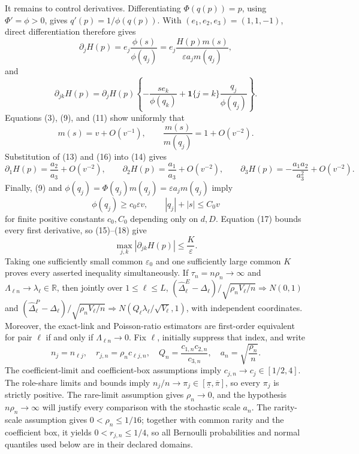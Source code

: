 It remains to control derivatives. Differentiating \(\Phi(q(p))=p\), using \(\Phi'=\phi>0\), gives \(q'(p)=1/\phi(q(p))\). With \((e_1,e_2,e_3)=(1,1,-1)\), direct differentiation therefore gives
\[
 \partial_jH(p)=e_j\frac{\phi(s)}{\phi(q_j)}
 =e_j\frac{H(p)m(s)}{\varepsilon a_jm(q_j)},
\tag{14}
\]
and
\[
 \partial_{jk}H(p)=\partial_jH(p)
 \left\{-\frac{s e_k}{\phi(q_k)}
 +\boldsymbol 1\{j=k\}\frac{q_j}{\phi(q_j)}\right\}.
\tag{15}
\]
Equations (3), (9), and (11) show uniformly that
\[
 m(s)=v+O(v^{-1}),
 \qquad \frac{m(s)}{m(q_j)}=1+O(v^{-2}).
\tag{16}
\]
Substitution of (13) and (16) into (14) gives
\[
 \partial_1H(p)=\frac{a_2}{a_3}+O(v^{-2}),\qquad
 \partial_2H(p)=\frac{a_1}{a_3}+O(v^{-2}),\qquad
 \partial_3H(p)=-\frac{a_1a_2}{a_3^2}+O(v^{-2}).
\tag{17}
\]
Finally, (9) and \(\phi(q_j)=\Phi(q_j)m(q_j)=\varepsilon a_jm(q_j)\) imply
\[
 \phi(q_j)\geq c_0\varepsilon v,
 \qquad |q_j|+|s|\leq C_0v
\tag{18}
\]
for finite positive constants \(c_0,C_0\) depending only on \(d,D\). Equation (17) bounds every first derivative, so (15)--(18) give
\[
 \max_{j,k}|\partial_{jk}H(p)|\leq\frac{K}{\varepsilon}.
\]
Taking one sufficiently small common \(\varepsilon_0\) and one sufficiently large common \(K\) proves every asserted inequality simultaneously.
If \(\tau_n=n\rho_n\to\infty\) and \(\Lambda_{\ell n}\to\lambda_{\ell}\in\mathbb R\), then jointly over \(1\leq\ell\leq L\), \((\widehat\Delta^E_{\ell}-\Delta_{\ell})/\sqrt{\rho_nV_{\ell}/n}\Rightarrow N(0,1)\) and \((\widehat\Delta^P_{\ell}-\Delta_{\ell})/\sqrt{\rho_nV_{\ell}/n}\Rightarrow N(Q_{\ell}\lambda_{\ell}/\sqrt{V_{\ell}},1)\), with independent coordinates. Moreover, the exact-link and Poisson-ratio estimators are first-order equivalent for pair \(\ell\) if and only if \(\Lambda_{\ell n}\to0\).
Fix \(\ell\), initially suppress that index, and write
\[
 n_j=n_{\ell j},\quad r_{j,n}=\rho_nc_{\ell j,n},\quad
 Q_n=\frac{c_{1,n}c_{2,n}}{c_{3,n}},\quad
 a_n=\sqrt{\frac{\rho_n}{n}}.
\tag{1}
\]
The coefficient-limit and coefficient-box assumptions imply \(c_{j,n}\to c_j\in[1/2,4]\). The role-share limits and bounds imply \(n_j/n\to\pi_j\in[\underline\pi,\overline\pi]\), so every \(\pi_j\) is strictly positive. The rare-limit assumption gives \(\rho_n\to0\), and the hypothesis \(n\rho_n\to\infty\) will justify every comparison with the stochastic scale \(a_n\).
The rarity-scale assumption gives \(0<\rho_n\leq1/16\); together with common rarity and the coefficient box, it yields \(0<r_{j,n}\leq1/4\), so all Bernoulli probabilities and normal quantiles used below are in their declared domains.

